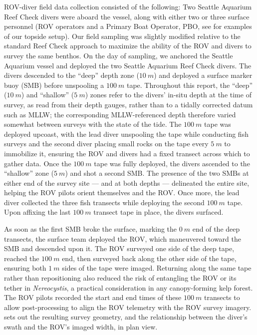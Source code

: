\documentclass[11pt]{article}
\newcommand{\boxedref}[2]{%
	\begingroup
	\setlength{\fboxrule}{0.8pt}%
	\setlength{\fboxsep}{1.5pt}%
	\textcolor{linkcyan}{%
		\fbox{%
			\textcolor{black}{%
				\hyperref[#2]{#1~\ref*{#2}}%
			}%
		}%
	}%
	\endgroup
}
\newcommand{\figref}[1]{\boxedref{Fig.}{#1}}\newcommand{\tabref}[1]{\boxedref{Table}{#1}}
\begin{document}
ROV-diver field data collection consisted of the following: 
Two Seattle Aquarium Reef Check divers were aboard the vessel, along with 
either two or three surface personnel (ROV operators and a Primary Boat 
Operator, PBO, see \figref{fig:field_methods} for examples of our topside 
setup).
Our field sampling was slightly modified relative to the standard Reef Check 
approach to maximize the ability of the ROV and divers to survey the same 
benthos.
On the day of sampling, we anchored the Seattle Aquarium vessel and deployed the two Seattle Aquarium Reef Check divers.
The divers descended to the ``deep'' depth zone ($10~m$) and deployed
a surface marker buoy (SMB) before unspooling a $100~m$ tape.
Throughout this report, the ``deep'' ($10~m$) and ``shallow'' ($5~m$) zones
refer to the divers' in-situ depth at the time of survey, as read from their
depth gauges, rather than to a tidally corrected datum such as MLLW; the
corresponding MLLW-referenced depth therefore varied somewhat between surveys
with the state of the tide.
The $100~m$ tape was deployed upcoast, with the lead diver unspooling the tape 
while conducting fish surveys and the second diver placing small rocks on the 
tape every $5~m$ to immobilize it, ensuring the ROV and divers had a fixed 
transect across which to gather data.
Once the $100~m$ tape was fully deployed, the divers ascended to the 
``shallow'' zone ($5~m$) and shot a second SMB.
The presence of the two SMBs at either end of the survey site --- and at both depths --- delineated the entire site, helping the ROV pilots orient themselves and the ROV.
Once more, the lead diver collected the three fish transects while
deploying the second $100~m$ tape.
Upon affixing the last $100~m$ transect tape in place, the divers surfaced.

As soon as the first SMB broke the surface, marking the $0~m$ end of the deep
transects, the surface team deployed the ROV, which maneuvered toward the SMB
and descended upon it.
The ROV surveyed one side of the deep tape, reached the $100~m$ end, then
surveyed back along the other side of the tape, ensuring both $1~m$ sides of
the tape were imaged.
Returning along the same tape rather than repositioning also reduced the risk
of entangling the ROV or its tether in \textit{Nereocystis}, a practical
consideration in any canopy-forming kelp forest.
The ROV pilots recorded the start and end times of these $100~m$
transects to allow post-processing to align the ROV telemetry with the ROV
survey imagery.
\figref{fig:survey_geometry} sets out the resulting survey geometry, and the
relationship between the diver's swath and the ROV's imaged width, in plan
view.
\end{document}
